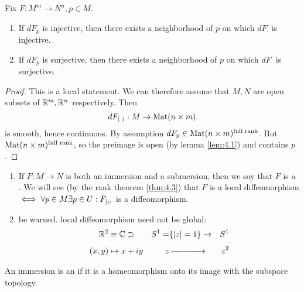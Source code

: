 \begin{lemma}\label{lem:4.2}
    Fix \(F:M^m\to N^n,p\in M\).
    \begin{enumerate}
        \item If \(dF_p\) is injective, then there exists a neighborhood of \(p\) on which 
              \(dF_{\cdot}\) is injective. 
        \item If \(dF_p\) is surjective, then there exists a neighborhood of \(p\) on which 
        \(dF_{\cdot}\) is surjective. 
    \end{enumerate}
\end{lemma}

\begin{proof}
    This is a local statement. We can therefore assume that \(M,N\) are open subsets of \(\mathbb{R}^m,\mathbb{R}^n\) respectively.
    Then \[dF_{(\cdot)}:M\to {\text{Mat}}(n\times m)\] 
    is smooth, hence continuous. By assumption \(dF_p\in {\text{Mat}}(n\times m)^{\text{full rank}}\). But \({\text{Mat}}(n\times m)^{\text{full rank}}\), so 
    the preimage is open (by lemma \ref{lem:4.1}) and contains \(p\).
\end{proof}

\begin{remark}
    \begin{enumerate}
        \item If \(F:M\to N\) is both an immersion and a submersion, then we say that \(F\) is a . We will see (by the rank theorem \ref{thm:4.3})
        that \(F\) is a local diffeomorphism \(\iff\forall p\in M\exists p\in U: F_{|_{U}}\) is a diffeomorphism.
        \item be warned. local diffeomorphism need not be global: \begin{alignat*}{10}
            \R^2&\equiv \C\supset& S^1=&\{|z|=1\}\to &S^1\\
            (x,y)&\mapsto x+iy &z&\xmapsto{\phantom{\{|z|=1\}\to}}  &z^2
        \end{alignat*}
    \end{enumerate}
\end{remark}

\begin{definition*}
    An immersion is an  if it is a homeomorphism onto its image 
    with the subspace topology.
\end{definition*}

